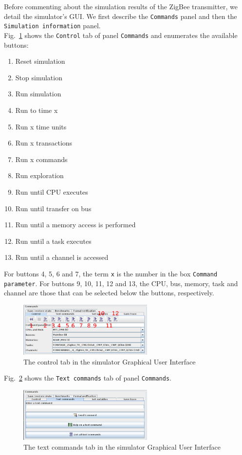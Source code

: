 \documentclass{llncs}
\begin{document}
%
Before commenting about the simulation results of the ZigBee transmitter, we detail the simulator's GUI. We first
describe the \texttt{Commands} panel and then the \texttt{Simulation information} panel.\\
%
Fig.~\ref{fig:CmdCtrl} shows the \texttt{Control} tab of panel \texttt{Commands} and enumerates the available buttons:
%
\begin{enumerate}
	\item Reset simulation
	\item Stop simulation
	\item Run simulation
	\item Run to time x
	\item Run x time units
	\item Run x transactions
	\item Run x commands
	\item Run exploration
	\item Run until CPU executes
	\item Run until transfer on bus
	\item Run until a memory access is performed
	\item Run until a task executes
	\item Run until a channel is accessed
\end{enumerate}
%
For buttons 4, 5, 6 and 7, the term \texttt{x} is the number in the box \texttt{Command parameter}. For buttons 9, 10,
11, 12 and 13, the CPU, bus, memory, task and channel are those that can be selected below the buttons, respectively.
%
\begin{figure}[!htbp]
	\centering
	\includegraphics[width=0.6\textwidth]{figures/screenshot/CmdCtrl.png}
	\caption{The control tab in the simulator Graphical User Interface}
	\label{fig:CmdCtrl}
\end{figure}
%
Fig.~\ref{fig:CmdTextCommands} shows the \texttt{Text commands} tab of panel \texttt{Commands}.
%
\begin{figure}[!htbp]
	\centering
	\includegraphics[width=0.6\textwidth]{figures/screenshot/CmdTextCommands.png}
	\caption{The text commands tab in the simulator Graphical User Interface}
	\label{fig:CmdTextCommands}
\end{figure}
\end{document}
